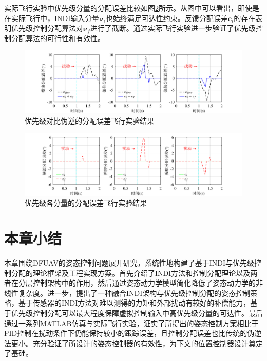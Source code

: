 实际飞行实验中优先级分量的分配误差比较如图\ref{优先级各分量的分配误差飞行实验结果}所示。从图中可以看出，即使是在实际飞行中，INDI输入分量$\boldsymbol{\nu}_i$也始终满足可达性约束。反馈分配误差$\boldsymbol{e}_i$的存在表明优先级控制分配算法对$\boldsymbol{\nu}_f$进行了截断。通过实际飞行实验进一步验证了优先级控制分配算法的可行性和有效性。
\begin{figure}[htbp]
	\centering
	\begin{minipage}[c]{1\textwidth}
        \centering
        \includegraphics[scale=1]{Fig/优先级对比伪逆的分配误差飞行实验结果.pdf}
        \caption{\label{优先级对比伪逆的分配误差飞行实验结果}优先级对比伪逆的分配误差飞行实验结果}
        \end{minipage}
\end{figure}
\begin{figure}[htbp]
	\centering
	\begin{minipage}[c]{1\textwidth}
        \centering
        \includegraphics[scale=1]{Fig/优先级各分量的分配误差飞行实验结果.pdf}
        \caption{\label{优先级各分量的分配误差飞行实验结果}优先级各分量的分配误差飞行实验结果}
        \end{minipage}
\end{figure}

\section{本章小结}

本章围绕DFUAV的姿态控制问题展开研究，系统性地构建了基于INDI与优先级控制分配的理论框架及工程实现方案。首先介绍了INDI方法和控制分配理论以及两者在分层控制架构中的作用，然后通过姿态动力学模型简化降低了姿态动力学的非线性复杂度。进一步，提出了一种融合INDI架构与优先级控制分配的姿态控制策略，基于传感器的INDI方法对难以测得的力矩和外部扰动有较好的补偿能力，基于优先级控制分配可以最大程度保障虚拟控制输入中高优先级分量的可达性。最后通过一系列MATLAB仿真与实际飞行实验，证实了所提出的姿态控制方案相比于PID控制在扰动条件下仍能保持较小的跟踪误差，且控制分配误差也比传统的伪逆法更小。充分验证了所设计的姿态控制器的有效性，为下文的位置控制器设计奠定了基础。